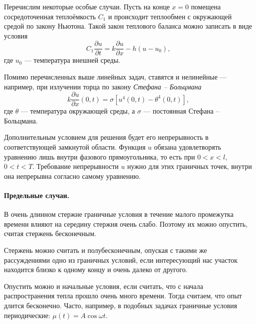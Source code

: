 Перечислим некоторые особые случаи. Пусть на конце $ x = 0 $ помещена
сосредоточенная теплоёмкость $ C_1 $ и происходит теплообмен с окружающей средой
по закону Ньютона. Такой закон теплового баланса можно записать в виде условия
\[
    C_1 \frac{\partial u}{\partial t} = k \frac{\partial u}{\partial x} -
    h(u-u_0),
\]
где $ u_0 $ --- температура внешней среды.


Помимо перечисленных выше линейных задач, ставятся и нелинейные --- например, при
излучении торца по закону \emph{Стефана -- Больцмана} 
\[
  k \frac{\partial u}{\partial x}(0, t) = \sigma [u^4(0, t) - \theta^4(0,t)],
\]
где $ \theta $ --- температура окружающей среды, а $ \sigma $ --- постоянная
Стефана -- Больцмана.

Дополнительным условием для решения будет его непрерывность в соответствующей
замкнутой области. Функция $ u $ обязана удовлетворять уравнению лишь внутри фазового прямоугольника, то
есть при $ 0 < x < l $, $ 0 < t < T $. Требование непрерывности $ u
$ нужно для этих граничных точек, внутри она непрерывна согласно самому уравнению.

\paragraph{Предельные случаи.}\label{sec:teplo} В очень длинном стержне граничные условия в
течение малого промежутка времени влияют на середину стержня очень слабо.
Поэтому их можно опустить, считая стержень бесконечным.

Стержень можно считать и полубесконечным, опуская с такими же рассуждениями одно
из граничных условий, если интересующий нас участок находится близко к одному
концу и очень далеко от другого.

Опустить можно и начальные условия, если считать, что с начала распространения
тепла прошло очень много времени. Тогда считаем, что опыт длится бесконечно.
Часто, например, в подобных задачах граничные
условия периодические: $ \mu(t) = A\cos\omega t $.


